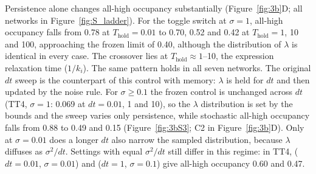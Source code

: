 \documentclass[11pt]{article}
\providecommand{\DIFaddtex}[1]{{\protect\color{red}#1}} %
\providecommand{\DIFdeltex}[1]{} %
\providecommand{\DIFaddbegin}{} %
\providecommand{\DIFaddend}{} %
\providecommand{\DIFdelbegin}{} %
\providecommand{\DIFdelend}{} %
\providecommand{\DIFadd}[1]{\texorpdfstring{\DIFaddtex{#1}}{#1}} %
\providecommand{\DIFdel}[1]{\texorpdfstring{\DIFdeltex{#1}}{}} %
\providecommand{\DIFaddincludegraphics}[2][]{\DIFOincludegraphics[#1]{#2}} %
\providecommand{\DIFdelincludegraphics}[2][]{}
\DeclareRobustCommand{\DIFaddbegin}{\DIFOaddbegin \let\includegraphics\DIFaddincludegraphics} %
\DeclareRobustCommand{\DIFaddend}{\DIFOaddend \let\includegraphics\DIFOincludegraphics} %
\DeclareRobustCommand{\DIFdelbegin}{\DIFOdelbegin \let\includegraphics\DIFdelincludegraphics} %
\DeclareRobustCommand{\DIFdelend}{\DIFOaddend \let\includegraphics\DIFOincludegraphics} %
\begin{document}
\DIFadd{Persistence alone changes all-high occupancy substantially (Figure~\ref{fig:3b}D; all networks in Figure~\ref{fig:S_ladder}). For the toggle switch at $\sigma = 1$, all-high occupancy falls from 0.78 at $T_\text{hold} = 0.01$ to 0.70, 0.52 and 0.42 at $T_\text{hold} = 1$, 10 and 100, approaching the frozen limit of 0.40, although the distribution of $\lambda$ is identical in every case. The crossover lies at $T_\text{hold} \approx 1$--10, }\DIFaddend the \DIFaddbegin \DIFadd{expression relaxation time ($1/k_i$). The same pattern holds in all seven networks. The original $dt$ sweep is the counterpart of this control with memory: $\lambda$ is held for $dt$ and then updated by the noise rule. For $\sigma \geq 0.1$ the frozen control is unchanged across $dt$ (TT4, $\sigma = 1$: 0.069 at $dt = 0.01$, 1 and 10), so the $\lambda$ distribution is set by the bounds and the sweep varies only persistence, while stochastic }\DIFaddend all-high \DIFdelbegin \DIFdel{state if they start from the }\DIFdelend \DIFaddbegin \DIFadd{occupancy falls from 0.88 to 0.49 and 0.15 (Figure~\ref{fig:3bS3}; C2 in Figure~\ref{fig:3b}D). Only at $\sigma = 0.01$ does a longer $dt$ also narrow the sampled distribution, because $\lambda$ diffuses as $\sigma^2/dt$. Settings with equal $\sigma^2/dt$ still differ in this regime: in TT4, ($dt = 0.01$, $\sigma = 0.01$) and ($dt = 1$, $\sigma = 0.1$) give }\DIFaddend all-high \DIFdelbegin \DIFdel{state (a frequency of 0.25)}\DIFdelend \DIFaddbegin \DIFadd{occupancy 0.60 and 0.47}\DIFaddend .
\DIFdelbegin \DIFdel{However, in stochastic simulations, asymmetry in the response of shifted Hill function ensures that a strongly repressed state is maintained only when the source node is on, or when both are off. This asymmetry leads to a higher probability (equivalent to MRT) of }\DIFdelend \DIFaddbegin 
\end{document}
